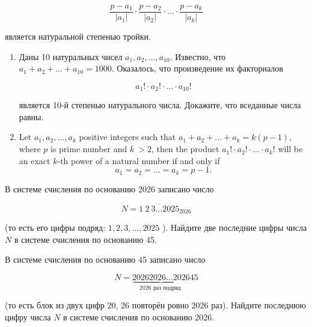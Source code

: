 $$
\frac{p-a_1}{\left|a_1\right|} \cdot \frac{p-a_2}{\left|a_2\right|} \cdot \ldots \cdot \frac{p-a_k}{\left|a_k\right|}
$$

является натуральной степенью тройки.

\begin{enumerate}
    \item[a)] Даны 10 натуральных чисел $a_1, a_2, \ldots, a_{10}$. Известно, что $a_1+a_2+\ldots+a_{10}=1000$. Оказалось, что произведение их факториалов
        
    $$
    a_{1}!\cdot a_{2}!\cdot \ldots \cdot a_{10}!
    $$
    
    
    является 10-й степенью натурального числа. Докажите, что вседанные числа равны.
    \item[b)] 
    Let $a_1, a_2, \ldots , a_k$ positive integers such that $a_1+a_2+ \ldots + a_k = k(p-1),$ where $p$ is prime number and $k\ > 2$, then the product $a_1! \cdot a_2! \cdot \ldots \cdot a_k!$ will be an exact $k$-th power of a natural number if and only if 
    \[a_1=a_2=\ldots=a_k=p-1.\]
\end{enumerate}

В системе счисления по основанию 2026 записано число

$$
N=\overline{1\ 2\ 3 \ldots 2025}_{2026}
$$

(то есть его цифры подряд: $1,2,3, \ldots, 2025$ ).
Найдите две последние цифры числа $N$ в системе счисления по основанию 45.


В системе счисления по основанию 45 записано число

$$
N=\underbrace{20262026 \ldots 2026}_{2026 \text { раз подряд }} 45
$$

(то есть блок из двух цифр 20, 26 повторён ровно 2026 раз).
Найдите последнюю цифру числа $N$ в системе счисления по основанию 2026.